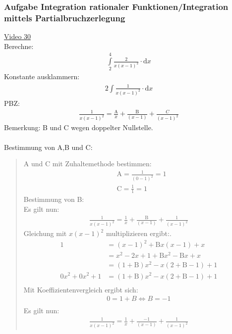\subsubsection{Aufgabe Integration rationaler Funktionen/Integration mittels Partialbruchzerlegung }
\href{https://youtu.be/CS1aHixYoYU}{Video 30}\\
Berechne:\
\begin{align*}
\int\limits_{2}^{4} \frac{2}{x(x-1)^2}\cdot \mathrm{d}x
\end{align*}
Konstante ausklammern:\\
\begin{align*}
2\int\limits_{}^{}  \frac{1}{x(x-1)^2}\cdot \mathrm{d}x
\end{align*}
PBZ:\\
\begin{align*}
\frac{1}{x(x-1)^2}=\frac{\mathrm{A}}{x}+\frac{\mathrm{B}}{(x-1)}+\frac{C}{(x-1)^2}
\end{align*}
Bemerkung: B und C wegen doppelter Nullstelle.\\
\\
Bestimmung von A,B und C:\\
\begin{quote}
	A und C mit Zuhaltemethode bestimmen:\\
	\begin{align*}
	&\mathrm{A}=\frac{1}{(0-1)^2}=1\\
	&\mathrm{C}=\frac{1}{1}=1
	\end{align*}
	Bestimmung von B:\\
	Es gilt nun:\\
	\begin{align*}
	\frac{1}{x(x-1)^2}=\frac{\mathrm{1}}{x}+\frac{\mathrm{B}}{(x-1)}+\frac{1}{(x-1)^2}
	\end{align*}
	Gleichung mit $ x(x-1)^2 $ multiplizieren ergibt:.\\
	\begin{align*}
	1&=(x-1)^2+\mathrm{B}x(x-1)+x\\
	&=x^2-2x+1+\mathrm{B}x^2-\mathrm{B}x+x\\
	&=(1+\mathrm{B})x^2-x(2+\mathrm{B}-1)+1\\
	0x^2+0x^2+1&=(1+\mathrm{B})x^2-x(2+\mathrm{B}-1)+1\\
	\end{align*}
	Mit Koeffizientenvergleich ergibt sich:\\
	\begin{align*}
	0=1+B\Leftrightarrow B=-1\\
	\end{align*}
	Es gilt nun:\\
	\begin{align*}
	\frac{1}{x(x-1)^2}=\frac{\mathrm{1}}{x}+\frac{\mathrm{-1}}{(x-1)}+\frac{1}{(x-1)^2}
	\end{align*}
\end{quote}
